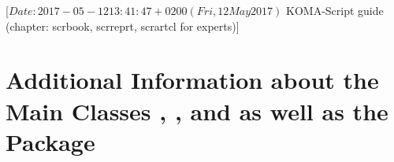 %
%
%
%
%
%
%
%
% 
%
%
%
%

                 [$Date: 2017-05-12 13:41:47 +0200 (Fri, 12 May 2017) $
                  KOMA-Script guide (chapter: scrbook, scrreprt, scrartcl for
                                     experts)]



\chapter[{Additional Information about the Main Classes and 
  \Package{scrextend}}]{Additional Information about the Main Classes 
  ,
  , and  as well as the Package
  }
\BeginIndexGroup
{}%
%
%
%

